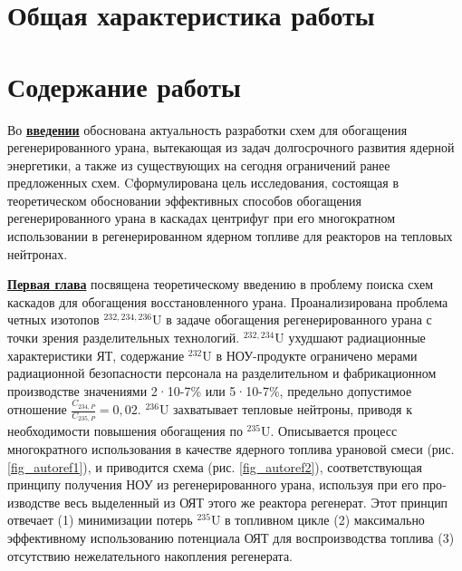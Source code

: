 \section*{Общая характеристика работы}

\newcommand{\actuality}{\underline{\textbf{\actualityTXT}}}
\newcommand{\progress}{\underline{\textbf{\progressTXT}}}
\newcommand{\aim}{\underline{{\textbf\aimTXT}}}
\newcommand{\tasks}{\underline{\textbf{\tasksTXT}}}
\newcommand{\novelty}{\underline{\textbf{\noveltyTXT}}}
\newcommand{\influence}{\underline{\textbf{\influenceTXT}}}
\newcommand{\methods}{\underline{\textbf{\methodsTXT}}}
\newcommand{\defpositions}{\underline{\textbf{\defpositionsTXT}}}
\newcommand{\reliability}{\underline{\textbf{\reliabilityTXT}}}
\newcommand{\probation}{\underline{\textbf{\probationTXT}}}
\newcommand{\contribution}{\underline{\textbf{\contributionTXT}}}
\newcommand{\publications}{\underline{\textbf{\publicationsTXT}}}



\section*{Содержание работы}
Во \underline{\textbf{введении}} обоснована актуальность разработки схем для обогащения регенерированного урана, вытекающая из задач долгосрочного развития ядерной энергетики, а также из существующих на сегодня ограничений ранее предложенных схем. Cформулирована цель исследования, состоящая в теоретическом обосновании эффективных способов обогащения регенерированного урана в каскадах цен­трифуг при его многократном использовании в регенерированном ядерном топливе для реакторов на тепловых нейтронах.

\underline{\textbf{Первая глава}} посвящена теоретическому введению в проблему поиска схем каскадов для обогащения восстановленного урана. Проанализирована проблема четных изотопов $^{232,234,236}$U в задаче обогащения регенерированного урана с точки зрения разделительных технологий. $^{232,234}$U ухудшают радиационные характеристики ЯТ, содержание $^{232}$U в НОУ-продукте ограничено мерами радиационной безопасности персонала на разделительном и фабрикационном производстве значениями 2·10-7\% или 5·10-7\%, предельно допустимое отношение $\frac{C_{234,{P}}}{C_{235,{P}}} = 0,02$. $^{236}$U захватывает тепловые нейтроны, приводя к необходимости повышения обогащения по $^{235}$U. Описывается процесс многократного использования в качестве ядерного топлива урановой смеси (рис. \ref{fig_autoref1}), и приводится схема (рис. \ref{fig_autoref2}), соответствующая принципу получения НОУ из регенерированного урана, используя при его про­изводстве весь выделенный из ОЯТ этого же реактора регенерат. Этот принцип отвечает (1) минимизации потерь  $^{235}$U в топливном цикле (2) максимально эффективному использованию потенциала ОЯТ для воспроизвод­ства топлива (3) отсутствию нежелательного накопления регенерата.


